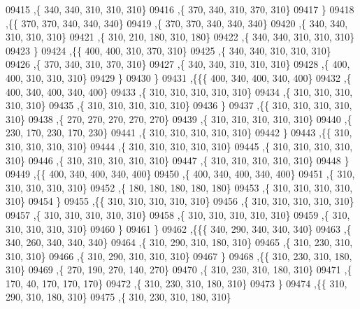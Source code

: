 \begin{DoxyCode}
09415     ,\{   340,   340,   310,   310,   310\}
09416     ,\{   370,   340,   310,   370,   310\}
09417     \}
09418    ,\{\{   370,   370,   340,   340,   340\}
09419     ,\{   370,   370,   340,   340,   340\}
09420     ,\{   340,   340,   310,   310,   310\}
09421     ,\{   310,   210,   180,   310,   180\}
09422     ,\{   340,   340,   310,   310,   310\}
09423     \}
09424    ,\{\{   400,   400,   310,   370,   310\}
09425     ,\{   340,   340,   310,   310,   310\}
09426     ,\{   370,   340,   310,   370,   310\}
09427     ,\{   340,   340,   310,   310,   310\}
09428     ,\{   400,   400,   310,   310,   310\}
09429     \}
09430    \}
09431   ,\{\{\{   400,   340,   400,   340,   400\}
09432     ,\{   400,   340,   400,   340,   400\}
09433     ,\{   310,   310,   310,   310,   310\}
09434     ,\{   310,   310,   310,   310,   310\}
09435     ,\{   310,   310,   310,   310,   310\}
09436     \}
09437    ,\{\{   310,   310,   310,   310,   310\}
09438     ,\{   270,   270,   270,   270,   270\}
09439     ,\{   310,   310,   310,   310,   310\}
09440     ,\{   230,   170,   230,   170,   230\}
09441     ,\{   310,   310,   310,   310,   310\}
09442     \}
09443    ,\{\{   310,   310,   310,   310,   310\}
09444     ,\{   310,   310,   310,   310,   310\}
09445     ,\{   310,   310,   310,   310,   310\}
09446     ,\{   310,   310,   310,   310,   310\}
09447     ,\{   310,   310,   310,   310,   310\}
09448     \}
09449    ,\{\{   400,   340,   400,   340,   400\}
09450     ,\{   400,   340,   400,   340,   400\}
09451     ,\{   310,   310,   310,   310,   310\}
09452     ,\{   180,   180,   180,   180,   180\}
09453     ,\{   310,   310,   310,   310,   310\}
09454     \}
09455    ,\{\{   310,   310,   310,   310,   310\}
09456     ,\{   310,   310,   310,   310,   310\}
09457     ,\{   310,   310,   310,   310,   310\}
09458     ,\{   310,   310,   310,   310,   310\}
09459     ,\{   310,   310,   310,   310,   310\}
09460     \}
09461    \}
09462   ,\{\{\{   340,   290,   340,   340,   340\}
09463     ,\{   340,   260,   340,   340,   340\}
09464     ,\{   310,   290,   310,   180,   310\}
09465     ,\{   310,   230,   310,   310,   310\}
09466     ,\{   310,   290,   310,   310,   310\}
09467     \}
09468    ,\{\{   310,   230,   310,   180,   310\}
09469     ,\{   270,   190,   270,   140,   270\}
09470     ,\{   310,   230,   310,   180,   310\}
09471     ,\{   170,    40,   170,   170,   170\}
09472     ,\{   310,   230,   310,   180,   310\}
09473     \}
09474    ,\{\{   310,   290,   310,   180,   310\}
09475     ,\{   310,   230,   310,   180,   310\}

\end{DoxyCode}
